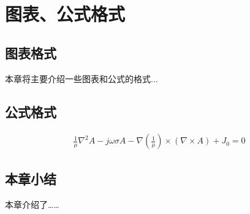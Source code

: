 \newpage
{}

\section{图表、公式格式}
\subsection{图表格式}
本章将主要介绍一些图表和公式的格式...\\









\subsection{公式格式}


\begin{eqnarray}
\frac{1}{\mu} \nabla^2A - j \omega \sigma A -\nabla(\frac{1}{\mu}) \times(\nabla \times A)+J_0=0
\end{eqnarray}


\subsection{本章小结}
本章介绍了……
